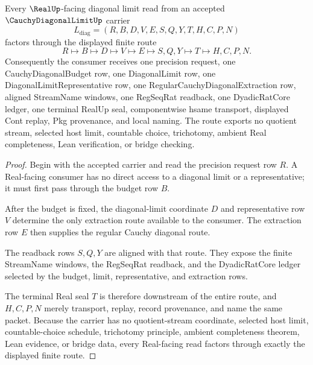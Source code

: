 \begin{theorem}
\label{thm:cauchy-diagonal-limit-real-seal-route}
Every $\RealUp$-facing diagonal limit read from an accepted $\CauchyDiagonalLimitUp$ carrier
$$
L_{\mathrm{diag}}=(R,B,D,V,E,S,Q,Y,T,H,C,P,N)
$$
factors through the displayed finite route
$$
R \longmapsto B \longmapsto D \longmapsto V \longmapsto E \longmapsto S,Q,Y \longmapsto T \longmapsto H,C,P,N .
$$
Consequently the consumer receives one precision request, one CauchyDiagonalBudget row, one DiagonalLimit row, one DiagonalLimitRepresentative row, one RegularCauchyDiagonalExtraction row, aligned StreamName windows, one RegSeqRat readback, one DyadicRatCore ledger, one terminal RealUp seal, componentwise hsame transport, displayed Cont replay, Pkg provenance, and local naming. The route exports no quotient stream, selected host limit, countable choice, trichotomy, ambient Real completeness, Lean verification, or bridge checking.
\end{theorem}
\begin{proof}
Begin with the accepted carrier and read the precision request row $R$. A Real-facing consumer has no direct access to a diagonal limit or a representative; it must first pass through the budget row $B$.

After the budget is fixed, the diagonal-limit coordinate $D$ and representative row $V$ determine the only extraction route available to the consumer. The extraction row $E$ then supplies the regular Cauchy diagonal route.

The readback rows $S,Q,Y$ are aligned with that route. They expose the finite StreamName windows, the RegSeqRat readback, and the DyadicRatCore ledger selected by the budget, limit, representative, and extraction rows.

The terminal Real seal $T$ is therefore downstream of the entire route, and $H,C,P,N$ merely transport, replay, record provenance, and name the same packet. Because the carrier has no quotient-stream coordinate, selected host limit, countable-choice schedule, trichotomy principle, ambient completeness theorem, Lean evidence, or bridge data, every Real-facing read factors through exactly the displayed finite route.
\end{proof}

